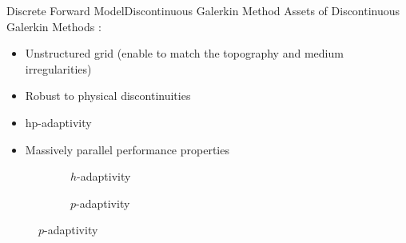 \begin{frame}{Discrete Forward Model}{Discontinuous Galerkin Method}
  Assets of Discontinuous Galerkin Methods : \\

  \begin{itemize}
  \item Unstructured grid (enable to match the topography and medium irregularities)
  \item Robust to physical discontinuities
  \item hp-adaptivity
  \item Massively parallel performance properties
  \end{itemize}

  \begin{figure}[H]
    \centering
     \begin{subfigure}[!htbp]{0.5\textwidth}
     \centering
      
      \caption{$h$-adaptivity}
      \end{subfigure}
    \hspace{-1cm}
     \begin{subfigure}[!htbp]{0.5\textwidth}
     \centering
    
\caption{$p$-adaptivity}
\end{subfigure}
\end{figure}

\end{frame}
